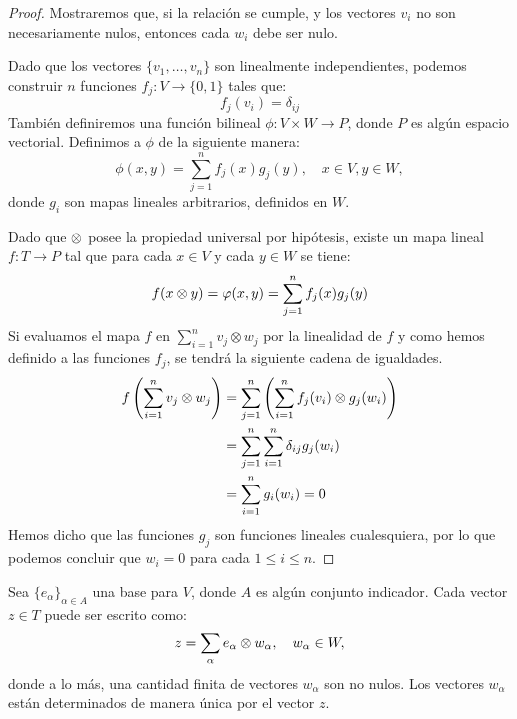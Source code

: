 \begin{proof}
	Mostraremos que, si la relación se cumple, y los vectores $v_i$ no son
	necesariamente nulos, entonces cada $w_i$ debe ser nulo.

	Dado que los vectores $\{v_1,\ldots, v_n\}$ son linealmente independientes,
	podemos construir $n$ funciones $f_j: V \to \{0,1\}$ tales que:
	\[
		f_j (v_i) = \delta_{ij}
	\]
	También definiremos una función bilineal $\phi: V \times W \to P$, donde $P$
	es algún espacio vectorial. Definimos a $\phi$ de la siguiente manera:
	\[
		\phi(x,y) = \sum_{j=1}^{n} f_j(x)g_j(y), \quad x \in V, y \in W,
	\]
	donde $g_i$ son mapas lineales arbitrarios, definidos en $W$.

	Dado que $\otimes$ posee la propiedad universal por hipótesis, existe un mapa
	lineal $f: T \to P$ tal que para cada $x \in V$ y cada $y \in W$ se tiene:
	\[
		f(x \otimes y) = \varphi(x,y) = \sum_{j=1}^{n} f_j(x)g_j(y)
	\]
	Si evaluamos el mapa $f$ en $\sum_{i=1}^{n} v_j \otimes w_j$ por la
	linealidad de $f$ y como hemos definido a las funciones $f_j$, se tendrá la
	siguiente cadena de igualdades.
	\begin{align*}
		f\left( \sum_{i=1}^{n} v_j \otimes w_j \right)
		 & = \sum_{j=1}^{n} \left( \sum_{i=1}^{n} f_j(v_i) \otimes g_j(w_i) \right) \\
		 & = \sum_{j=1}^{n} \sum_{i=1}^{n} \delta_{ij} g_j(w_i)          \\
		 & = \sum_{i=1}^{n} g_i(w_i) = 0
	\end{align*}
	Hemos dicho que las funciones $g_j$ son funciones lineales cualesquiera,
	por lo que podemos concluir que $w_i = 0$ para cada $1 \leq i \leq n$.
\end{proof}

\begin{lemma}
	Sea $\{e_\alpha\}_{\alpha \in A}$ una base para $V$, donde $A$ es algún
	conjunto indicador. Cada vector $z \in T$ puede ser escrito como:
	\[
		z = \sum_{\alpha} e_{\alpha} \otimes w_{\alpha}, \quad w_{\alpha} \in W,
	\]
	donde a lo más, una cantidad finita de vectores $w_\alpha$ son no nulos.
	Los vectores $w_\alpha$ están determinados de manera única por el vector $z$.
\end{lemma}

